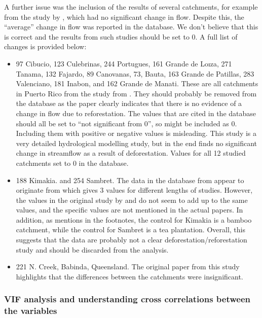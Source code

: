 \documentclass[]{elsarticle} %
\providecommand{\tightlist}{%
  \setlength{\itemsep}{0pt}\setlength{\parskip}{0pt}}
\begin{document}
A further issue was the inclusion of the results of several catchments, for example from the study by \citet{beck2013}, which had no significant change in flow. Despite this, the ``average'' change in flow was reported in the database. We don't believe that this is correct and the results from such studies should be set to 0. A full list of changes is provided below:

\begin{itemize}
\tightlist
\item
  97 Cibucio, 123 Culebrinas, 244 Portugues, 161 Grande de Loıza, 271 Tanama, 132 Fajardo, 89 Canovanas, 73, Bauta, 163 Grande de Patillas, 283 Valenciano, 181 Inabon, and 162 Grande de Manati. These are all catchments in Puerto Rico from the study from \citet{beck2013}. They should probably be removed from the database as the paper clearly indicates that there is no evidence of a change in flow due to reforestation. The values that are cited in the database should all be set to ``not significant from 0'', so might be included as 0. Including them with positive or negative values is misleading. This study is a very detailed hydrological modelling study, but in the end finds no significant change in streamflow as a result of deforestation. Values for all 12 studied catchments set to 0 in the database.
\item
  188 Kimakia. and 254 Sambret. The data in the database from \citet{zhang2017} appear to originate from \citet{bruijnzeel1990} which gives 3 values for different lengths of studies. However, the values in the original study by \citet{blackie1979kimakia} and \citet{blackie1979kericho} do not seem to add up to the same values, and the specific values are not mentioned in the actual papers. In addition, as \citet{bruijnzeel1990} mentions in the footnotes, the control for Kimakia is a bamboo catchment, while the control for Sambret is a tea plantation. Overall, this suggests that the data are probably not a clear deforestation/reforestation study and should be discarded from the analysis.
\item
  221 N. Creek, Babinda, Queensland. The original paper from this study highlights that the differences between the catchments were insignificant.
\end{itemize}

\hypertarget{vif-analysis-and-understanding-cross-correlations-between-the-variables}{%
\subsubsection{VIF analysis and understanding cross correlations between the variables}\label{vif-analysis-and-understanding-cross-correlations-between-the-variables}}
\end{document}
